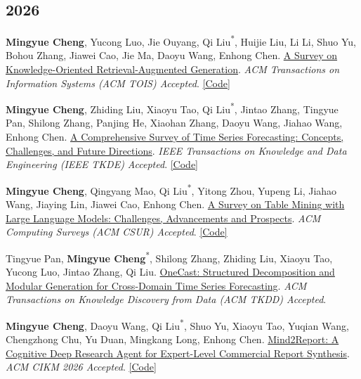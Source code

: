 \documentclass[UTF8,fontset=fandol,scheme=plain,11pt,a4paper]{ctexart}
\newcommand{\pubentry}[1]{\item \begin{minipage}[t]{\linewidth}#1\end{minipage}}
\begin{document}
\subsection{2026}
\begin{publist}[start=4]
\pubentry{\textbf{Mingyue Cheng}, Yucong Luo, Jie Ouyang, Qi Liu\textsuperscript{*}, Huijie Liu, Li Li, Shuo Yu, Bohou Zhang, Jiawei Cao, Jie Ma, Daoyu Wang, Enhong Chen. \href{https://arxiv.org/pdf/2503.10677}{A Survey on Knowledge-Oriented Retrieval-Augmented Generation}. \emph{ACM Transactions on Information Systems (ACM TOIS) Accepted}. \href{https://github.com/USTCAGI/Awesome-Papers-Retrieval-Augmented-Generation}{[Code]}}

\pubentry{\textbf{Mingyue Cheng}, Zhiding Liu, Xiaoyu Tao, Qi Liu\textsuperscript{*}, Jintao Zhang, Tingyue Pan, Shilong Zhang, Panjing He, Xiaohan Zhang, Daoyu Wang, Jiahao Wang, Enhong Chen. \href{https://d197for5662m48.cloudfront.net/documents/publicationstatus/253323/preprint\_pdf/0d1d8e876fb85a212190bc9200dcc3f3.pdf}{A Comprehensive Survey of Time Series Forecasting: Concepts, Challenges, and Future Directions}. \emph{IEEE Transactions on Knowledge and Data Engineering (IEEE TKDE) Accepted}. \href{https://github.com/USTCAGI/Awesome-Papers-Time-Series-Forecasting}{[Code]}}

\pubentry{\textbf{Mingyue Cheng}, Qingyang Mao, Qi Liu\textsuperscript{*}, Yitong Zhou, Yupeng Li, Jiahao Wang, Jiaying Lin, Jiawei Cao, Enhong Chen. \href{https://www.techrxiv.org/doi/full/10.36227/techrxiv.174352282.22844759/v1}{A Survey on Table Mining with Large Language Models: Challenges, Advancements and Prospects}. \emph{ACM Computing Surveys (ACM CSUR) Accepted}. \href{https://github.com/USTCAGI/Awesome-LLM-Table-Mining}{[Code]}}

\pubentry{Tingyue Pan, \textbf{Mingyue Cheng}\textsuperscript{*}, Shilong Zhang, Zhiding Liu, Xiaoyu Tao, Yucong Luo, Jintao Zhang, Qi Liu. \href{https://arxiv.org/pdf/2510.24028}{OneCast: Structured Decomposition and Modular Generation for Cross-Domain Time Series Forecasting}. \emph{ACM Transactions on Knowledge Discovery from Data (ACM TKDD) Accepted}.}

\pubentry{\textbf{Mingyue Cheng}, Daoyu Wang, Qi Liu\textsuperscript{*}, Shuo Yu, Xiaoyu Tao, Yuqian Wang, Chengzhong Chu, Yu Duan, Mingkang Long, Enhong Chen. \href{https://arxiv.org/pdf/2601.04879}{Mind2Report: A Cognitive Deep Research Agent for Expert-Level Commercial Report Synthesis}. \emph{ACM CIKM 2026 Accepted}. \href{https://github.com/Melmaphother/Mind2Report}{[Code]}}


\end{publist}
\end{document}
